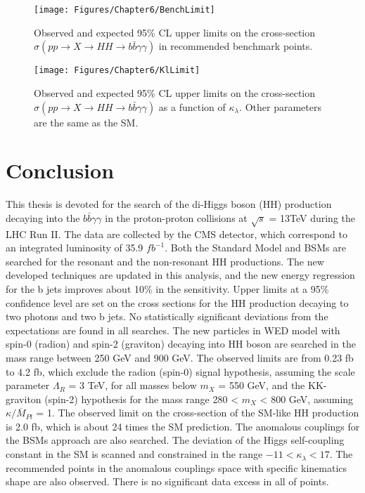 \begin{figure}[h]
  \centering
  \texttt{[image: Figures/Chapter6/BenchLimit]}
  \caption{Observed and expected 95\% CL upper limits on the cross-section $\sigma(pp\rightarrow X \rightarrow HH \rightarrow b\bar{b}\gamma\gamma)$ in recommended benchmark points.}
  \label{fig:BenchLimit}
\end{figure}

\begin{figure}[h]
  \centering
  \texttt{[image: Figures/Chapter6/KlLimit]}
  \caption{Observed and expected 95\% CL upper limits on the cross-section $\sigma(pp\rightarrow X \rightarrow HH \rightarrow b\bar{b}\gamma\gamma)$ as a function of $\kappa_{\lambda}$. Other parameters are the same as the SM.}
  \label{fig:KlLimit}
\end{figure}





\chapter{Conclusion}

This thesis is devoted for the search of the di-Higgs boson (HH) production decaying into the $b\bar{b}\gamma\gamma$ in the proton-proton collisions at $\sqrt{s}$ = 13TeV during the LHC Run II.
The data are collected by the CMS detector, which correspond to an integrated luminosity of 35.9 $fb^{-1}$.
Both the Standard Model and BSMs are searched for the resonant and the non-resonant HH productions.
The new developed techniques are updated in this analysis, and the new energy regression for the b jets improves about 10\% in the sensitivity.
Upper limits at a 95\% confidence level are set on the cross sections for the HH production decaying to two photons and two b jets.
No statistically significant deviations from the expectations are found in all searches.
The new particles in WED model with spin-0 (radion) and spin-2 (graviton) decaying into HH boson are searched in the mass range between 250 GeV and 900 GeV.
The observed limits are from 0.23 fb to 4.2 fb, which exclude the radion (spin-0) signal hypothesis, assuming the scale parameter $\Lambda_{R}$ = 3 TeV, for all masses below $m_{X}$ = 550 GeV, and the KK-graviton (spin-2) hypothesis for the mass range 280 < $m_{X}$ < 800 GeV, assuming $\kappa/\overline{M}_{Pl}$ = 1.
The observed limit on the cross-section of the SM-like HH production is 2.0 fb, which is about 24 times the SM prediction.
The anomalous couplings for the BSMs approach are also searched.
The deviation of the Higgs self-coupling constant in the SM is scanned and constrained in the range $-11 < \kappa_{\lambda} < 17$.
The recommended points in the anomalous couplings space with specific kinematics shape are also observed.
There is no significant data excess in all of points.
